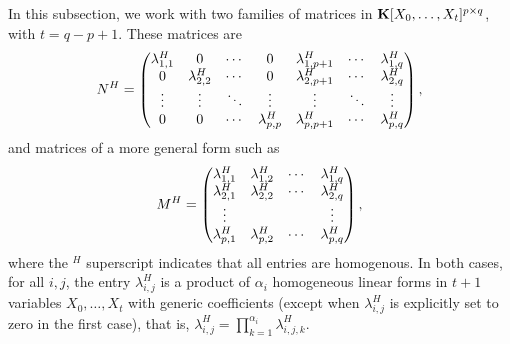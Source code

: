 \documentclass[12pt]{article}
\begin{document}
In this subsection, we work with two families of matrices in
$\mathbf{K}[X_0,\dots,X_t]^{p\times q}$, with $t=q-p+1$. These matrices are
\begin{align}\label{eqdef:type1}
{N}^H= \left( \begin{matrix}
\lambda^H_{1,1} & 0 & \cdots & 0 & \lambda^H_{1,p+1} & \cdots & \lambda^H_{1, q}\\
0 & \lambda^H_{2,2} & \cdots & 0 & \lambda^H_{2,p+1} & \cdots & \lambda^H_{2, q}\\
\vdots & \vdots & \ddots & \vdots & \vdots & \ddots & \vdots\\
0 & 0 & \cdots & \lambda^H_{p,p} & \lambda^H_{p,p+1} & \cdots & \lambda^H_{p, q}
\end{matrix} \right),
\end{align}
and matrices of a more general form such as
\begin{align}\label{eqdef:type2}
{M}^H= \left( \begin{matrix}
\lambda^H_{1,1} & \lambda^H_{1,2} & \cdots & \lambda^H_{1, q}\\
 \lambda^H_{2,1} &  \lambda^H_{2,2} & \cdots & \lambda^H_{2, q}\\
 \vdots & & & \vdots\\
 \lambda^H_{p,1} &  \lambda^H_{p,2}& \cdots & \lambda^H_{p, q}
\end{matrix} \right),
\end{align}
where the ${}^H$ superscript indicates that all entries are
homogenous.  In both cases, for all $i,j$, the entry $\lambda^H_{i,j}$
is a product of $\alpha_i$ homogeneous linear forms in $t+1$ variables
$X_0,\dots,X_t$ with generic coefficients (except when
$\lambda^H_{i,j}$ is explicitly set to zero in the first case), that
is, $\lambda^H_{i,j}=\prod_{k=1}^{\alpha_i} \lambda^H_{i,j,k}$. 
\end{document}
